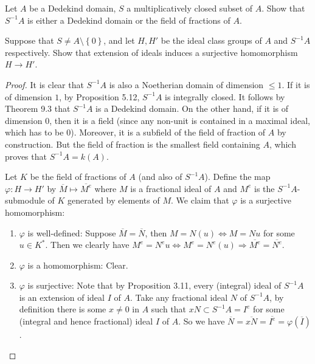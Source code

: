 \documentclass{solution}
\begin{document}
\begin{problem}
    Let $A$ be a Dedekind domain, $S$ a multiplicatively closed subset of $A$. Show that $S ^{-1} A$ is either a Dedekind domain or the field of fractions of $A$.

    Suppose that $S \ne A \setminus \left\lbrace 0 \right\rbrace$, and let $H, H'$ be the ideal class groups of $A$ and $S ^{-1} A$ respectively. Show that extension of ideals induces a surjective homomorphism $H \rightarrow H'$.
\end{problem}

\begin{proof}
    It is clear that $S ^{-1} A$ is also a Noetherian domain of dimension $\le 1$. If it is of dimension $1$, by Proposition 5.12, $S ^{-1} A$ is integrally closed. It follows by Theorem 9.3 that $S ^{-1} A$ is a Dedekind domain. On the other hand, if it is of dimension $0$, then it is a field (since any non-unit is contained in a maximal ideal, which has to be $0$). Moreover, it is a subfield of the field of fraction of $A$ by construction. But the field of fraction is the smallest field containing $A$, which proves that $S ^{-1} A = k(A)$.

    Let $K$ be the field of fractions of $A$ (and also of $S ^{-1}A$). Define the map $\varphi: H \rightarrow H'$ by $\overline{M} \mapsto \overline{M^e}$ where $M$ is a fractional ideal of $A$ and $M^e$ is the $S ^{-1} A$-submodule of $K$ generated by elements of $M$. We claim that $\varphi$ is a surjective homomorphism:
    \begin{enumerate}
        \item $\varphi$ is well-defined: Suppose $\overline{M} = \overline{N}$, then $M = N(u) \Leftrightarrow M = Nu$ for some $u \in K^*$. Then we clearly have $M^e = N^eu \Leftrightarrow M^e = N^e(u) \Rightarrow \overline{M^e} = \overline{N^e}$.
        \item $\varphi$ is a homomorphism: Clear.
        \item $\varphi$ is surjective: Note that by Proposition 3.11, every (integral) ideal of $S ^{-1}A$ is an extension of ideal $I$ of $A$. Take any fractional ideal $N$ of $S ^{-1} A$, by definition there is some $x \ne 0$ in $A$ such that $xN \subset S ^{-1} A = I^e$ for some (integral and hence fractional) ideal $I$ of $A$. So we have $\overline{N} = \overline{xN} = \overline{I^e} = \varphi(\overline{I})$.
    \end{enumerate}
\end{proof}
\end{document}

